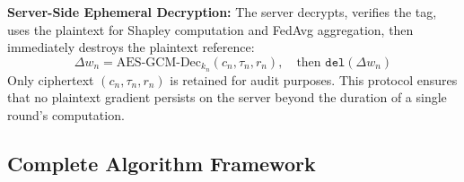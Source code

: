 \textbf{Server-Side Ephemeral Decryption:} The server decrypts, verifies the tag, uses the plaintext for Shapley computation and FedAvg aggregation, then immediately destroys the plaintext reference:
\begin{equation}
\Delta w_n = \text{AES-GCM-Dec}_{k_n}(c_n, \tau_n, r_n), \quad \text{then } \mathtt{del}(\Delta w_n)
\end{equation}
Only ciphertext $(c_n, \tau_n, r_n)$ is retained for audit purposes. This protocol ensures that no plaintext gradient persists on the server beyond the duration of a single round's computation.

\subsection{Complete Algorithm Framework}

